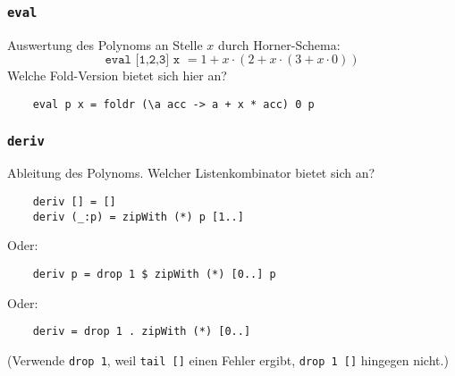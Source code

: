 \documentclass{beamer}
\begin{document}
\begin{frame}[fragile]
  \frametitle{\lstinline{eval}}
  Auswertung des Polynoms an Stelle $x$ durch Horner-Schema:
  \[\texttt{eval [1,2,3] x }= 1 + x\cdot(2 + x\cdot(3 + x\cdot0))\]
  Welche Fold-Version bietet sich hier an?
  \pause
  \begin{lstlisting}
    eval p x = foldr (\a acc -> a + x * acc) 0 p
  \end{lstlisting}
\end{frame}

\begin{frame}[fragile]
  \frametitle{\lstinline{deriv}}
  Ableitung des Polynoms. Welcher Listenkombinator bietet sich an?
  \pause
  \begin{lstlisting}
    deriv [] = []
    deriv (_:p) = zipWith (*) p [1..]
  \end{lstlisting}
  Oder:
  \begin{lstlisting}
    deriv p = drop 1 $ zipWith (*) [0..] p
  \end{lstlisting}
  Oder:
  \begin{lstlisting}
    deriv = drop 1 . zipWith (*) [0..]
  \end{lstlisting}
  (Verwende \lstinline{drop 1}, weil \lstinline{tail []} einen Fehler ergibt, \lstinline{drop 1 []} hingegen nicht.)
\end{frame}
\end{document}
